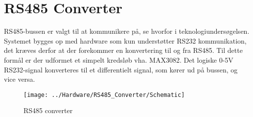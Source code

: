 \section{RS485 Converter}
RS485-bussen er valgt til at kommunikere på, se hvorfor i teknologiundersøgelsen. Systemet bygges op med hardware som kun understøtter RS232 kommunikation, det kræves derfor at der forekommer en konvertering til og fra RS485. Til dette formål er der udformet et simpelt kredsløb vha. MAX3082. Det logiske 0-5V RS232-signal konverteres til et differentielt signal, som kører ud på bussen, og vice versa.

\begin{figure}[H]
	\centering
	\texttt{[image: ../Hardware/RS485\_Converter/Schematic]}
	\caption{RS485 converter}
	\label{photo:RS485converter}
\end{figure}

